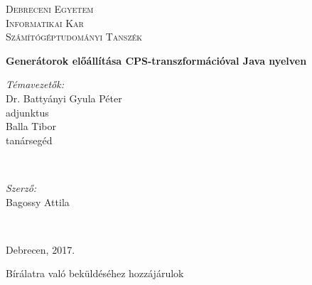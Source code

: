 %
%
%

\begin{titlepage}

\center

\textsc{\LARGE Debreceni Egyetem}\\[1.5cm]
\textsc{\Large Informatikai Kar}
\\[0.5cm]

\textsc{\large Számítógéptudományi Tanszék}
\\[2.5cm]

{\huge \bfseries Generátorok előállítása CPS-transzformációval Java nyelven \par}

\if{}
  \vspace*{6.5cm}

  \begin{minipage}[t]{0.4\textwidth}
    \begin{flushleft} 
      \large \textit{Témavezetők:} \\
      Dr. Battyányi Gyula Péter  \\
      adjunktus \\
      Balla Tibor \\
      tanársegéd 
      \par
    \end{flushleft}
  \end{minipage}
  ~
  \begin{minipage}[t]{0.4\textwidth}
    \begin{flushright}
      \large \textit{Szerző:}\\
      Bagossy Attila 
      \par
    \end{flushright}
  \end{minipage}
  \\[2.5cm]
\else
  \vspace*{10.5cm}
\fi

{\large Debrecen, 2017.}\\ 

\begin{flushleft}
	Bírálatra való beküldéséhez hozzájárulok
\end{flushleft}

\vfill

\end{titlepage}